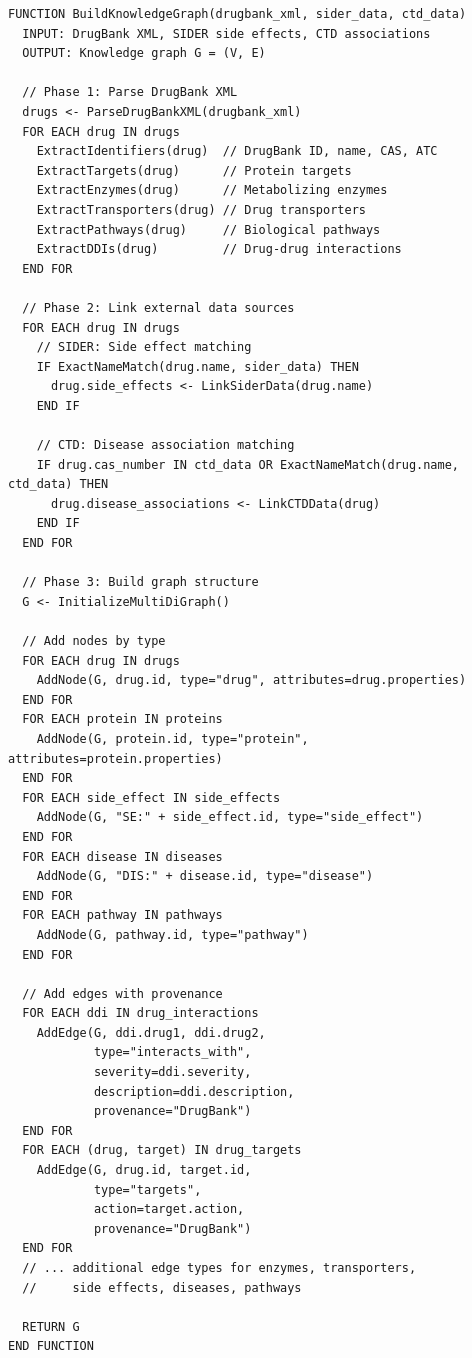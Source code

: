 \documentclass[12pt,a4paper]{article}
\begin{document}
\begin{verbatim}
FUNCTION BuildKnowledgeGraph(drugbank_xml, sider_data, ctd_data)
  INPUT: DrugBank XML, SIDER side effects, CTD associations
  OUTPUT: Knowledge graph G = (V, E)
  
  // Phase 1: Parse DrugBank XML
  drugs <- ParseDrugBankXML(drugbank_xml)
  FOR EACH drug IN drugs
    ExtractIdentifiers(drug)  // DrugBank ID, name, CAS, ATC
    ExtractTargets(drug)      // Protein targets
    ExtractEnzymes(drug)      // Metabolizing enzymes
    ExtractTransporters(drug) // Drug transporters
    ExtractPathways(drug)     // Biological pathways
    ExtractDDIs(drug)         // Drug-drug interactions
  END FOR
  
  // Phase 2: Link external data sources
  FOR EACH drug IN drugs
    // SIDER: Side effect matching
    IF ExactNameMatch(drug.name, sider_data) THEN
      drug.side_effects <- LinkSiderData(drug.name)
    END IF
    
    // CTD: Disease association matching
    IF drug.cas_number IN ctd_data OR ExactNameMatch(drug.name, ctd_data) THEN
      drug.disease_associations <- LinkCTDData(drug)
    END IF
  END FOR
  
  // Phase 3: Build graph structure
  G <- InitializeMultiDiGraph()
  
  // Add nodes by type
  FOR EACH drug IN drugs
    AddNode(G, drug.id, type="drug", attributes=drug.properties)
  END FOR
  FOR EACH protein IN proteins
    AddNode(G, protein.id, type="protein", attributes=protein.properties)
  END FOR
  FOR EACH side_effect IN side_effects
    AddNode(G, "SE:" + side_effect.id, type="side_effect")
  END FOR
  FOR EACH disease IN diseases
    AddNode(G, "DIS:" + disease.id, type="disease")
  END FOR
  FOR EACH pathway IN pathways
    AddNode(G, pathway.id, type="pathway")
  END FOR
  
  // Add edges with provenance
  FOR EACH ddi IN drug_interactions
    AddEdge(G, ddi.drug1, ddi.drug2, 
            type="interacts_with",
            severity=ddi.severity,
            description=ddi.description,
            provenance="DrugBank")
  END FOR
  FOR EACH (drug, target) IN drug_targets
    AddEdge(G, drug.id, target.id,
            type="targets",
            action=target.action,
            provenance="DrugBank")
  END FOR
  // ... additional edge types for enzymes, transporters, 
  //     side effects, diseases, pathways
  
  RETURN G
END FUNCTION
\end{verbatim}
\end{document}

